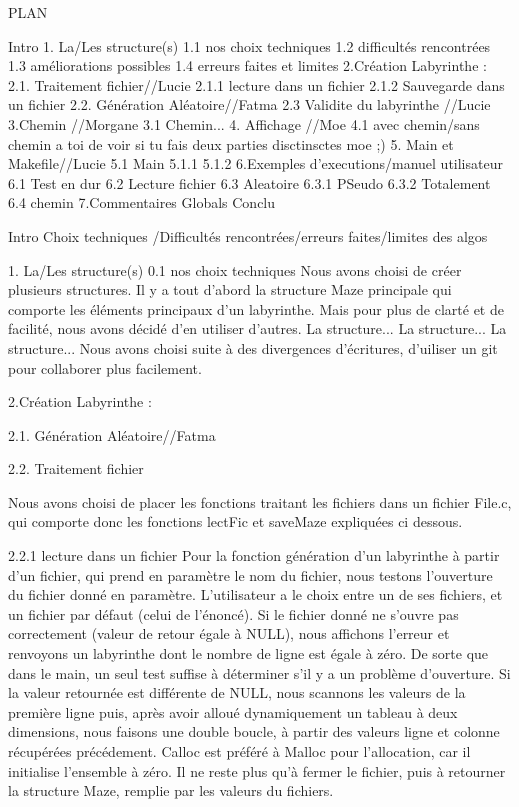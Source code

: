 PLAN

Intro
1. La/Les  structure(s)
  1.1 nos choix techniques
  1.2 difficultés rencontrées
  1.3 améliorations possibles
  1.4 erreurs faites et limites
2.Création Labyrinthe :
  2.1. Traitement fichier//Lucie
    2.1.1 lecture dans un fichier
    2.1.2 Sauvegarde dans un fichier
  2.2. Génération Aléatoire//Fatma
  2.3 Validite du labyrinthe //Lucie
3.Chemin //Morgane
  3.1 Chemin...
4. Affichage //Moe
  4.1 avec chemin/sans chemin a toi de voir si tu fais deux parties disctinsctes moe ;)
5. Main et Makefile//Lucie
  5.1 Main
    5.1.1
    5.1.2
6.Exemples d'executions/manuel utilisateur
  6.1 Test en dur
  6.2 Lecture fichier
  6.3 Aleatoire
    6.3.1 PSeudo
    6.3.2 Totalement
  6.4 chemin
7.Commentaires Globals
Conclu






Intro
Choix techniques /Difficultés rencontrées/erreurs faites/limites des algos


1. La/Les  structure(s)
0.1 nos choix techniques
  Nous avons choisi de créer plusieurs structures. Il y a tout d'abord la structure Maze principale qui comporte les éléments principaux d'un labyrinthe. Mais pour plus de clarté et de facilité, nous avons décidé d'en utiliser d'autres.
  La structure...
  La structure...
  La structure...
Nous avons choisi suite à des divergences d'écritures, d'uiliser un git pour collaborer plus facilement.


2.Création Labyrinthe :

2.1. Génération Aléatoire//Fatma

2.2. Traitement fichier

Nous avons choisi de placer les fonctions traitant les fichiers dans un fichier File.c, qui comporte donc les fonctions lectFic et saveMaze expliquées ci dessous.

2.2.1 lecture dans un fichier
Pour la fonction génération d'un labyrinthe à partir d'un fichier, qui prend en paramètre le nom du fichier, nous testons l'ouverture du fichier donné en paramètre. L'utilisateur a le choix entre un de ses fichiers, et un fichier par défaut (celui de l'énoncé). Si le fichier donné ne s'ouvre pas correctement (valeur de retour égale à NULL), nous affichons l'erreur et renvoyons un labyrinthe dont le nombre de ligne est égale à zéro. De sorte que dans le main, un seul test suffise à déterminer s'il y a un problème d'ouverture.
Si la valeur retournée est différente de NULL, nous scannons les valeurs de la première ligne puis, après avoir alloué dynamiquement un tableau à deux dimensions, nous faisons une double boucle, à partir des valeurs ligne et colonne récupérées précédement. Calloc est préféré à Malloc pour l'allocation, car il initialise l'ensemble à zéro. Il ne reste plus qu'à fermer le fichier, puis à retourner la structure Maze, remplie par les valeurs du fichiers.

